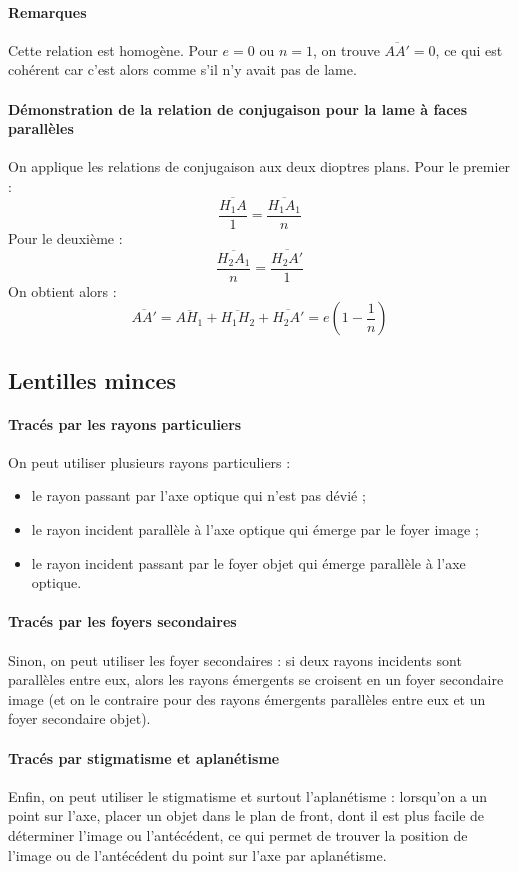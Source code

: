 \documentclass[french]{book}
\theoremstyle{plain}
\theoremstyle{definition}
\theoremstyle{remark}
\begin{document}
\paragraph{Remarques} Cette relation est homogène. Pour $e=0$ ou $n=1$, on trouve $\overline{AA'}=0$, ce qui est cohérent car c'est alors comme s'il n'y avait pas de lame.
\paragraph{Démonstration de la relation de conjugaison pour la lame à faces parallèles} On applique les relations de conjugaison aux deux dioptres plans. Pour le premier : $$\frac{\overline{H_1A}}{1}=\frac{\overline{H_1A_1}}{n}$$ Pour le deuxième : $$\frac{\overline{H_2A_1}}{n}=\frac{\overline{H_2A'}}{1}$$ On obtient alors : $$\overline{AA'}=\overline{AH_1}+\overline{H_1H_2}+\overline{H_2A'}=e\left(1-\frac{1}{n}\right)$$
\subsection{Lentilles minces}
\paragraph{Tracés par les rayons particuliers} On peut utiliser plusieurs rayons particuliers :
\begin{itemize}
	\item le rayon passant par l'axe optique qui n'est pas dévié ;
	\item le rayon incident parallèle à l'axe optique qui émerge par le foyer image ;
	\item le rayon incident passant par le foyer objet qui émerge parallèle à l'axe optique.
\end{itemize}
\paragraph{Tracés par les foyers secondaires}
Sinon, on peut utiliser les foyer secondaires : si deux rayons incidents sont parallèles entre eux, alors les rayons émergents se croisent en un foyer secondaire image (et on le contraire pour des rayons émergents parallèles entre eux et un foyer secondaire objet). 
\paragraph{Tracés par stigmatisme et aplanétisme}Enfin, on peut utiliser le stigmatisme et surtout l'aplanétisme : lorsqu'on a un point sur l'axe, placer un objet dans le plan de front, dont il est plus facile de déterminer l'image ou l'antécédent, ce qui permet de trouver la position de l'image ou de l'antécédent du point sur l'axe par aplanétisme.
\end{document}
